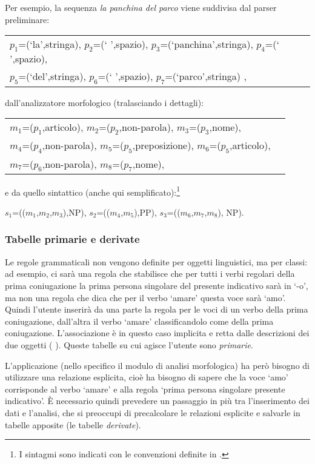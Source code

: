 \documentclass[twoside,stylearticle,11pt,filologia,it,article,bibsection]{spinoza}
\begin{document}
Per esempio, la sequenza {\it la panchina del parco} viene suddivisa
dal parser preliminare:
\begin{lingeq}
\begin{tabular}{ll}
$p_1$=(`la',stringa), $p_2$=(` ',spazio), $p_3$=(`panchina',stringa), $p_4$=(` ',spazio),\\
  $p_5$=(`del',stringa), $p_6$=(` ',spazio), $p_7$=(`parco',stringa) ,\\
\end{tabular}
\end{lingeq}
\noindent dall'analizzatore morfologico (tralasciando i dettagli):
\begin{lingeq}
\begin{tabular}{ll}
$m_1$=($p_1$,articolo), $m_2$=($p_2$,non-parola), $m_3$=($p_3$,nome),\\
  $m_4$=($p_4$,non-parola), $m_5$=($p_5$,preposizione), $m_6$=($p_5$,articolo),\\
  $m_7$=($p_6$,non-parola), $m_8$=($p_7$,nome),\\
\end{tabular}
\end{lingeq}
\noindent e da quello sintattico (anche qui semplificato):\footnote{I
  sintagmi sono indicati con le convenzioni definite in
  .}
\begin{lingeq}
$s_1$=(($m_1$,$m_2$,$m_3$),NP), $s_2$=(($m_4$,$m_5$),PP), $s_3$=(($m_6$,$m_7$,$m_8$), NP).
\end{lingeq}

\subsubsection{Tabelle primarie e derivate}

Le regole  grammaticali non vengono definite  per oggetti linguistici,
ma per classi:  ad esempio, ci sarà una regola  che stabilisce che per
tutti  i verbi  regolari  della prima  coniugazione  la prima  persona
singolare del presente indicativo sarà  in `-o', ma non una regola che
dica che per il verbo  `amare' questa voce sarà `amo'. Quindi l'utente
inserirà da  una parte la regola per  le voci di un  verbo della prima
coniugazione, dall'altra  il verbo `amare'  classificandolo come della
prima coniugazione. L'associazione è  in questo caso implicita e retta
dalle       descrizioni       dei       due       oggetti       (\vedi
{}). Queste tabelle su cui agisce l'utente sono
        {\it primarie}.

L'applicazione (nello specifico il modulo di analisi morfologica) ha
però bisogno di utilizzare una relazione esplicita, cioè ha bisogno di
sapere che la voce `amo' corrisponde al verbo `amare' e alla regola
`prima persona singolare presente indicativo'. È necessario quindi
prevedere un passaggio in più tra l'inserimento dei dati e l'analisi,
che si preoccupi di precalcolare le relazioni esplicite e salvarle in
tabelle apposite (le tabelle {\it derivate}).
\end{document}
